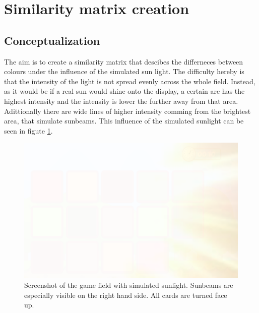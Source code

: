 \section{Similarity matrix creation}

\subsection{Conceptualization}
The aim is to create a similarity matrix that descibes the differneces between colours under the influence of the simulated sun light. The difficulty hereby is that the intensity of the light is not spread evenly across the whole field. Instead, as it would be if a real sun would shine onto the display, a certain are has the highest intensity and the intensity is lower the further away from that area. Adittionally there are wide lines of higher intensity comming from the brightest area, that simulate sunbeams. This influence of the simulated sunlight can be seen in figute \ref{fig:glareEffect}. 

\begin{figure}[H]
	\centering
	\includegraphics[width=15cm]{images/glareEffect.png}
	\caption[Bild kurz]{Screenshot of the game field with simulated sunlight. Sunbeams are especially visible on the right hand side. All cards are turned face up.}
	\label{fig:glareEffect}
\end{figure}

